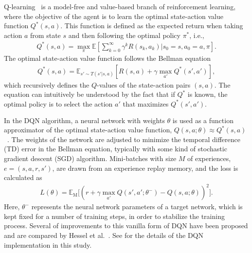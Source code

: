 Q-learning~\cite{Watkins1992} is a model-free and value-based branch of reinforcement learning, where the objective of the agent is to learn the optimal state-action value function $Q^*(s,a)$. This function is defined as the expected return when taking action $a$ from state $s$ and then following the optimal policy $\pi^*$, i.e.,
%
\begin{align}
     Q^*(s,a) = \max_\pi \mathbb{E} \left[ \sum_{k=0}^\infty \gamma^k R(s_k, a_k) | s_0 = s, a_0 = a, \pi\right].
\end{align}
The optimal state-action value function follows the Bellman equation
\begin{align}
    Q^*(s,a) = \mathbb{E}_{s' \sim T(s'|s,a)}\left[R(s,a) + \gamma \max_{a'} Q^*(s',a')\right],
\end{align}
%
which recursively defines the $Q$-values of the state-action pairs $(s,a)$. The equation can intuitively be understood by the fact that if $Q^*$ is known, the optimal policy is to select the action $a'$ that maximizes $Q^*(s',a')$.

In the DQN algorithm, a neural network with weights $\theta$ is used as a function approximator of the optimal state-action value function, $Q(s,a;\theta) \approx Q^*(s,a)$~\cite{Mnih2015}. The weights of the network are adjusted to minimize the temporal difference (TD) error in the Bellman equation, typically with some kind of stochastic gradient descent (SGD) algorithm. Mini-batches with size $M$ of experiences, $e=(s,a,r,s')$, are drawn from an experience replay memory, and the loss is calculated as
%
\begin{align}
    L(\theta) = \mathbb{E}_\mathrm{M} \Big[ (r + \gamma \max_{a'} Q(s',a';\theta^-)
    - Q(s,a;\theta) )^2 \Big].
    \label{eq:lossDQN}
\end{align}
%
Here, $\theta^-$ represents the neural network parameters of a target network, which is kept fixed for a number of training steps, in order to stabilize the training process. 
Several of improvements to this vanilla form of DQN have been proposed and are compared by Hessel et al.~\cite{Hessel2018}.
See \paperEnsamble for the details of the DQN implementation in this study.